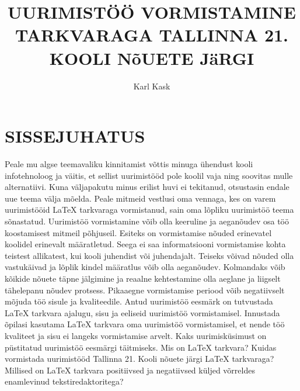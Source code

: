 \documentclass{21kuur}
\title{UURIMISTÖÖ VORMISTAMINE \latex TARKVARAGA TALLINNA 21. KOOLI NõUETE JäRGI}
\author{Karl Kask}
\begin{document}
\maketitle
\tableofcontents

\newpage
\chapter*{SISSEJUHATUS}
Peale mu algse teemavaliku kinnitamist võttis minuga ühendust kooli infotehnoloog ja väitis, et sellist uurimistööd pole koolil vaja ning soovitas mulle alternatiivi. Kuna väljapakutu minus erilist huvi ei tekitanud, otsustasin endale uue teema välja mõelda. Peale mitmeid vestlusi oma vennaga, kes on varem uurimistööid LaTeX tarkvaraga vormistanud, sain oma lõpliku uurimistöö teema sõnastatud.
Uurimistöö vormistamine võib olla keeruline ja aeganõudev osa töö koostamisest mitmeil põhjuseil. Esiteks on vormistamise nõuded erinevatel koolidel erinevalt määratletud. Seega ei saa informatsiooni vormistamise kohta teistest allikatest, kui kooli juhendist või juhendajalt. Teiseks võivad nõuded olla vastukäivad ja lõplik kindel määratlus võib olla aeganõudev. Kolmandaks võib kõikide nõuete täpne jälgimine ja reaalne kehtestamine olla aeglane ja liigselt tähelepanu nõudev protsess. Pikaaegne vormistamise periood võib negatiivselt mõjuda töö sisule ja kvaliteedile.
Antud uurimistöö eesmärk on tutvustada LaTeX tarkvara ajalugu, sisu ja eeliseid uurimistöö vormistamisel. Innustada õpilasi kasutama LaTeX tarkvara oma uurimistöö vormistamisel, et nende töö kvaliteet ja sisu ei langeks vormistamise arvelt. 
Kaks uurimisküsimust on püstitatud uurimistöö eesmärgi täitmiseks. Mis on LaTeX tarkvara? Kuidas vormistada uurimistööd Tallinna 21. Kooli nõuete järgi LaTeX tarkvaraga? Millised on LaTeX tarkvara positiivsed ja negatiivsed küljed võrreldes enamlevinud tekstiredaktoritega?
\newpage
\end{document}
